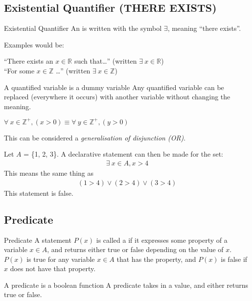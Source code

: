 \documentclass[../notes.tex]{subfiles}
\begin{document}
			\subsection[Existential Quantifier]{Existential Quantifier (THERE EXISTS)}
				\begin{definition}{Existential Quantifier}
					An  is written with the symbol $\exists $, meaning ``there exists''.
				\end{definition}
				\begin{example}
					Examples would be:
					\begin{indentparagraph}
						``There exists an $x \in \mathbb{R}$ such that\ldots'' (written $\exists \: x \in \mathbb{R}$)\\
						``For some $x \in \mathbb{Z}$ \ldots'' (written $\exists \: x \in \mathbb{Z}$)
					\end{indentparagraph}
				\end{example}
				\begin{sidenote}{A quantified variable is a dummy variable}
					Any quantified variable can be replaced (everywhere it occurs) with another variable without changing the meaning.
					\begin{example}
						$\forall \: x \in \mathbb{Z}^{+}, (x > 0) \equiv \forall \: y \in \mathbb{Z}^{+}, (y > 0)$
					\end{example}
				\end{sidenote}
				This can be considered a \emph{generalisation of disjunction (OR)}.
				\begin{example}
					Let $A$ = \{1, 2, 3\}. A declarative statement can then be made for the set:
					\begin{align*}
						\exists \: x \in A, x > 4
					\end{align*}
					This means the same thing as 
					\begin{align*}
						(1 > 4) \lor (2 > 4) \lor (3 > 4)
					\end{align*}
					This statement is false.
				\end{example}
			\subsection{Predicate}
				\begin{definition}{Predicate}
					A statement $P(x)$ is called a  if it expresses some property of a variable $x \in A$, and returns either true or false depending on the value of $x$. $P(x)$ is true for any variable $x \in A$ that has the property, and $P(x)$ is false if $x$ does not have that property.
				\end{definition}
				\begin{sidenote}{A predicate is a boolean function}
					A predicate takes in a value, and either returns true or false.
				\end{sidenote}
\end{document}
